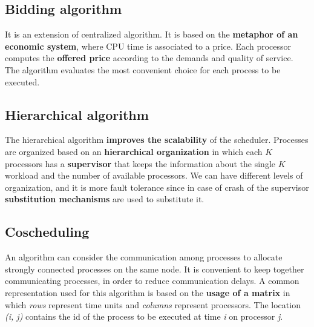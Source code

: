 \subsection{Bidding algorithm}
It is an extension of centralized algorithm. It is based on the \textbf{metaphor of an economic system}, where CPU time is associated to a price. Each processor computes the \textbf{offered price} according to the demands and quality of service. The algorithm evaluates the most convenient choice for each process to be executed. 

\subsection{Hierarchical algorithm}
The hierarchical algorithm \textbf{improves the scalability} of the scheduler. Processes are organized based on an \textbf{hierarchical organization} in which each \(K\) processors has a \textbf{supervisor} that keeps the information about the single \(K\) workload and the number of available processors. We can have different levels of organization, and it is more fault tolerance since in case of crash of the supervisor \textbf{substitution mechanisms} are used to substitute it.

\subsection{Coscheduling}
An algorithm can consider the communication among processes to allocate strongly connected processes on the same node. It is convenient to keep together communicating processes, in order to reduce communication delays. A common representation used for this algorithm is based on the \textbf{usage of a matrix} in which \textit{rows} represent time units and \textit{columns} represent processors. The location \textit{(i, j)} contains the id of the process to be executed at time \textit{i} on processor \textit{j}. 
